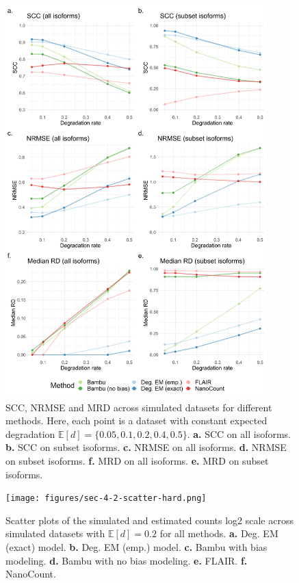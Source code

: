 \begin{figure}[H]
    \centering
    \includegraphics[width=0.9\textwidth]{figures/sec-4-2-scc-nrmse.png}
    \caption[SCC, NRMSE and MRD across simulated datasets for different methods]{SCC, NRMSE and MRD across simulated datasets for different methods. Here, each point is a dataset with constant expected degradation $\mathbb{E}[d]=\{0.05,0.1,0.2,0.4,0.5\}$. \textbf{a.} SCC on all isoforms. \textbf{b.} SCC on subset isoforms. \textbf{c.} NRMSE on all isoforms. \textbf{d.} NRMSE on subset isoforms. \textbf{f.} MRD on all isoforms. \textbf{e.} MRD on subset isoforms.}
    \label{fig:4-2-scc-nrmse}
\end{figure}

\newpage

\begin{figure}[H]
    \centering
    \texttt{[image: figures/sec-4-2-scatter-hard.png]}
    \caption[Scatter plots across simulated datasets for different methods]{Scatter plots of the simulated and estimated counts log2 scale across simulated datasets with $\mathbb{E}[d]=0.2$ for all methods. \textbf{a.} Deg. EM (exact) model. \textbf{b.} Deg. EM (emp.) model. \textbf{c.} Bambu with bias modeling. \textbf{d.} Bambu with no bias modeling. \textbf{e.} FLAIR. \textbf{f.} NanoCount.}
    \label{fig:4-2-scatter}
\end{figure}

